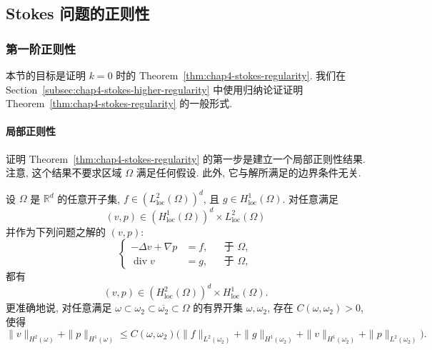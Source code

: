 \subsection{Stokes 问题的正则性}
\label{sec:chap4-stokes-regularity-proof}

\renewcommand{\thestatement}{6.\arabic{statement}}
\renewcommand{\theHstatement}{ch04.sec06.\arabic{statement}}
\setcounter{statement}{0}
\renewcommand{\thechapterfoursectionsixremark}{6.\arabic{chapterfoursectionsixremark}}

\subsubsection{第一阶正则性}
\label{subsec:chap4-stokes-first-regularity}

本节的目标是证明 $k=0$ 时的 Theorem~\ref{thm:chap4-stokes-regularity}. 我们在 Section~\ref{subsec:chap4-stokes-higher-regularity} 中使用归纳论证证明 Theorem~\ref{thm:chap4-stokes-regularity} 的一般形式.

\paragraph{局部正则性}
\label{subsubsec:chap4-stokes-local-regularity}

证明 Theorem~\ref{thm:chap4-stokes-regularity} 的第一步是建立一个局部正则性结果. 注意, 这个结果不要求区域 $\Omega$ 满足任何假设. 此外, 它与解所满足的边界条件无关.

\begin{Theorem}
\label{thm:chap4-stokes-local-regularity}
设 $\Omega$ 是 $\mathbb R^d$ 的任意开子集, $f\in(L_{\mathrm{loc}}^2(\Omega))^d$, 且 $g\in H_{\mathrm{loc}}^1(\Omega)$. 对任意满足
\[
 (v,p)\in(H_{\mathrm{loc}}^1(\Omega))^d\times L_{\mathrm{loc}}^2(\Omega)
\]
并作为下列问题之解的 $(v,p)$:
\[
 \left\{
 \begin{aligned}
  -\Delta v+\nabla p&=f,&&\text{于 }\Omega,\\
  \operatorname{div}v&=g,&&\text{于 }\Omega,
 \end{aligned}
 \right.
\]
都有
\[
 (v,p)\in(H_{\mathrm{loc}}^2(\Omega))^d\times H_{\mathrm{loc}}^1(\Omega).
\]
更准确地说, 对任意满足 $\omega\subset\omega_2\subset\overline{\omega_2}\subset\Omega$ 的有界开集 $\omega,\omega_2$, 存在 $C(\omega,\omega_2)>0$, 使得
\[
 \|v\|_{H^2(\omega)}+\|p\|_{H^1(\omega)}
 \leq C(\omega,\omega_2)\bigl(\|f\|_{L^2(\omega_2)}+\|g\|_{H^1(\omega_2)}
 +\|v\|_{H^1(\omega_2)}+\|p\|_{L^2(\omega_2)}\bigr).
\]
\end{Theorem}

